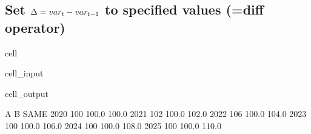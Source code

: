 \documentclass[letterpaper,10pt,english]{jupyterBook}
\begin{document}
\subsection{Set \protect\(\Delta = var_t - var_{t-1}\protect\) to specified values (=diff operator)}
\label{\detokenize{content/howto/update/model update:set-delta-var-t-var-t-1-to-specified-values-diff-operator}}
\begin{sphinxuseclass}{cell}\begin{sphinxVerbatimInput}

\begin{sphinxuseclass}{cell_input}
\begin{sphinxVerbatim}[commandchars=\\\{\}]

\end{sphinxVerbatim}

\end{sphinxuseclass}\end{sphinxVerbatimInput}
\begin{sphinxVerbatimOutput}

\begin{sphinxuseclass}{cell_output}
\begin{sphinxVerbatim}[commandchars=\\\{\}]
        A      B   SAME
2020  100  100.0  100.0
2021  102  100.0  102.0
2022  106  100.0  104.0
2023  100  100.0  106.0
2024  100  100.0  108.0
2025  100  100.0  110.0
\end{sphinxVerbatim}

\end{sphinxuseclass}\end{sphinxVerbatimOutput}

\end{sphinxuseclass}
\end{document}
